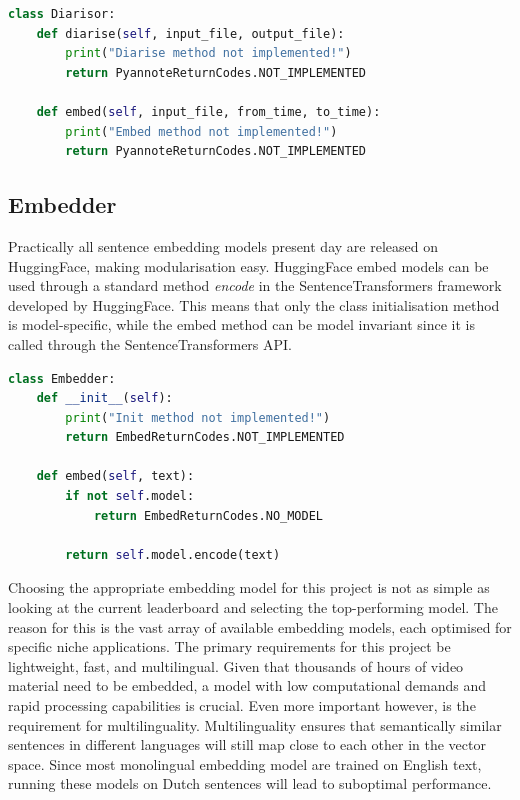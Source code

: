 \documentclass[twoside]{uva-inf-bachelor-thesis}
\begin{document}
\begin{lstlisting}[language=Python, caption={Modular speaker diarisation class.}]
class Diarisor:
    def diarise(self, input_file, output_file):
        print("Diarise method not implemented!")
        return PyannoteReturnCodes.NOT_IMPLEMENTED

    def embed(self, input_file, from_time, to_time):
        print("Embed method not implemented!")
        return PyannoteReturnCodes.NOT_IMPLEMENTED
\end{lstlisting}

\subsection{Embedder}
Practically all sentence embedding models present day are released on HuggingFace, making modularisation easy. HuggingFace embed models can be used through a standard method \textit{encode} in the SentenceTransformers framework developed by HuggingFace. This means that only the class initialisation method is model-specific, while the embed method can be model invariant since it is called through the SentenceTransformers API.

\begin{lstlisting}[language=Python, caption={Modular embed class.}]
class Embedder:
    def __init__(self):
        print("Init method not implemented!")
        return EmbedReturnCodes.NOT_IMPLEMENTED

    def embed(self, text):
        if not self.model:
            return EmbedReturnCodes.NO_MODEL

        return self.model.encode(text)
\end{lstlisting}

Choosing the appropriate embedding model for this project is not as simple as looking at the current leaderboard and selecting the top-performing model. The reason for this is the vast array of available embedding models, each optimised for specific niche applications. 
The primary requirements for this project be lightweight, fast, and multilingual. Given that thousands of hours of video material need to be embedded, a model with low computational demands and rapid processing capabilities is crucial. Even more important however, is the requirement for multilinguality. Multilinguality ensures that semantically similar sentences in different languages will still map close to each other in the vector space. Since most monolingual embedding model are trained on English text, running these models on Dutch sentences will lead to suboptimal performance.
\end{document}
